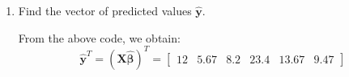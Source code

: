 \documentclass[11pt,twoside]{article}
\newcommand{\pts}[1]{\marginpar{ \small\hspace{0pt} \textit{[#1]} } }
\newcommand{\lt}{\left}
\newcommand{\rt}{\right}
\newcommand{\?}{\stackrel{?}{=}}
\newcommand{\bl}{\color{blue}}
\newenvironment{solution}{\begin{adjustwidth}{.05\textwidth}{}\bl}{\medskip\end{adjustwidth}}
\begin{document}
\begin{enumerate}[\bf (a)]
\begin{solution}
\begin{lstlisting}[language=R,basicstyle={\small\ttfamily}]
library(matlib)
z_mat = matrix(data = c(1,1,1,1,1,1,10,5,7,19,11,8),nrow=6,ncol=2)
y = matrix(data = c(15, 9, 3, 25, 7, 13),nrow=6)
z_1 = matrix(data = c(10, 5, 7, 19, 11, 8), nrow=6)
hatbeta = inv(t(z_mat)%*%z_mat)%*%(t(z_mat))%*%y
y_hat = z_mat%*%hatbeta
\end{lstlisting}

 The solution is:
 \begin{equation*}
   \hat{\bm\beta} =  \begin{bmatrix} -0.67 \\ 1.27  \end{bmatrix}
\end{equation*}


  \end{solution}


\item  Find the vector of predicted values  $\bm{\hat y}$. \pts{2pts}
  \begin{solution}
    From the above code, we obtain:
    \begin{equation*}
  \bm \hat y^{T} = \lt(\bm X\bm{\hat\beta} \rt)^{T} =
  \begin{bmatrix}
    12 & 5.67 & 8.2 & 23.4 & 13.67 & 9.47
  \end{bmatrix}
\end{equation*}
  \end{solution}


\end{enumerate}
\end{document}
